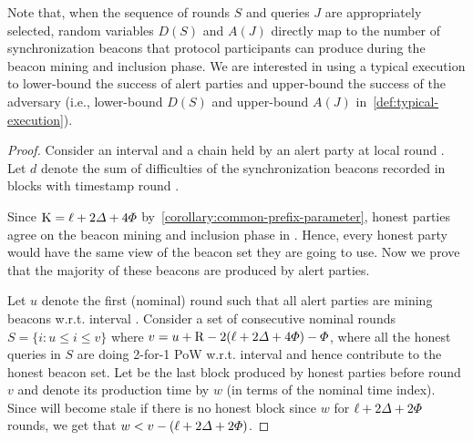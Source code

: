 Note that, when  the sequence of rounds $S$ and queries $J$ are appropriately selected, random variables $D(S)$ and $A(J)$ directly map to the number of synchronization beacons that protocol participants can produce during the beacon mining and inclusion phase.
%
We are interested in using a typical execution to lower-bound the success of alert parties and upper-bound the success of the adversary (i.e., lower-bound $D(S)$ and upper-bound $A(J)$ in~\cref{def:typical-execution}).

\lemmagoodbeacons

\begin{proof}
    Consider an interval \interval and a chain \chain held by an alert party at local round \protocolTime{\interval}{\interval \cdot \syncLen}.
    Let $d$ denote the sum of difficulties of the synchronization beacons recorded in blocks with timestamp round \Isync{\interval}.

    Since $\mathrm{K} = \ell + 2\varDelta + 4\varPhi$ by~\cref{corollary:common-prefix-parameter}, honest parties agree on the beacon mining and inclusion phase in \chain.
    Hence, every honest party would have the same view of the beacon set they are going to use.
    Now we prove that the majority of these beacons are produced by alert parties.

    Let $u$ denote the first (nominal) round such that all alert parties are mining beacons w.r.t. interval \interval.
    Consider a set of consecutive nominal rounds $S = \{i : u \le i \le v \}$ where $v = u + \mathrm{R} - 2(\ell + 2\varDelta + 4\varPhi) - \varPhi$, where all the honest queries in $S$ are doing 2-for-1 PoW w.r.t. interval \interval and hence contribute to the honest beacon set.
    Let \block be the last block produced by honest parties before round $v$ and denote its production time by $w$ (in terms of the nominal time index).
    Since \chain will become stale if there is no honest block since $w$ for $\ell + 2\varDelta + 2\varPhi$ rounds, we get that $w < v - (\ell + 2\varDelta + 2\varPhi)$.


\end{proof}
